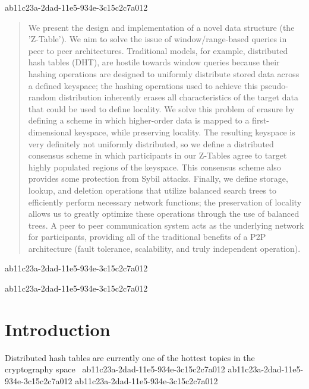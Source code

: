 \documentclass[12pt]{article}
\begin{document}
ab11c23a-2dad-11e5-934e-3c15c2c7a012\maketitle

\begin{abstract}
We present the design and implementation of a novel data structure (the 'Z-Table'). We aim to solve the issue of window/range-based queries in peer to peer architectures. Traditional models, for example,  distributed hash tables (DHT), are hostile towards window queries because their hashing operations are designed to uniformly distribute stored data across a defined keyspace; the hashing operations used to achieve this pseudo-random distribution inherently erases all characteristics of the target data that could be used to define locality. We solve this problem of erasure by defining a scheme in which higher-order data is mapped to a first-dimensional keyspace, while preserving locality. The resulting keyspace is very definitely not uniformly distributed, so we define a distributed consensus scheme in which participants in our Z-Tables agree to target highly populated regions of the keyspace. This consensus scheme also provides some protection from Sybil attacks. Finally, we define storage, lookup, and deletion operations that utilize balanced search trees to efficiently perform necessary network functions; the preservation of locality allows us to greatly optimize these operations through the use of balanced trees. A peer to peer communication system acts as the underlying network for participants, providing all of the traditional benefits of a P2P architecture (fault tolerance, scalability, and truly independent operation).
\end{abstract}
ab11c23a-2dad-11e5-934e-3c15c2c7a012

\newpage
ab11c23a-2dad-11e5-934e-3c15c2c7a012\section{Introduction}
Distributed hash tables are currently one of the hottest topics in the cryptography space~\cite{Stoica:2001dj,Rowstron:2001ea,Ratnasamy:2001wn}
ab11c23a-2dad-11e5-934e-3c15c2c7a012
ab11c23a-2dad-11e5-934e-3c15c2c7a012\printbibliography
ab11c23a-2dad-11e5-934e-3c15c2c7a012
\end{document}
